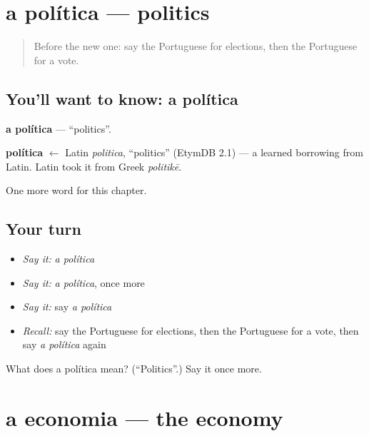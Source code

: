 \section[a política]{a política — politics}

\label{lesson:PT-C189-politica}



\begin{quote}
Before the new one: say the Portuguese for elections, then the Portuguese for a vote.
\end{quote}

\subsection*{You'll want to know: a política}
\textbf{a política} — \textquotedblleft{}politics\textquotedblright{}.

\begin{cousinweb}
\textbf{política} $\leftarrow$ Latin \emph{politica}, \textquotedblleft{}politics\textquotedblright{} (EtymDB 2.1) — a learned borrowing from Latin. Latin took it from Greek \emph{politikē}.
\end{cousinweb}

\begin{grammarlens}[title={What you've built}]
One more word for this chapter.
\end{grammarlens}

\subsection*{Your turn}
\begin{itemize}
\raggedright
  \item \emph{Say it:} \emph{a política}
  \item \emph{Say it:} \emph{a política}, once more
  \item \emph{Say it:} say \emph{a política}
  \item \emph{Recall:} say the Portuguese for elections, then the Portuguese for a vote, then say \emph{a política} again
\end{itemize}

\begin{tcolorbox}[breakable,colback=teal!4,colframe=teal!35!black,title={Before you move on}]
What does a política mean? (\textquotedblleft{}Politics\textquotedblright{}.) Say it once more.
\end{tcolorbox}
\section[a economia]{a economia — the economy}

